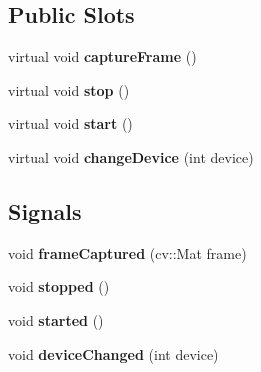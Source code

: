 \subsection*{Public Slots}
\begin{DoxyCompactItemize}
\item 
\mbox{\label{class_c_v_video_capture_aa8149e80fb17a0cf98425ebb17756ac0}} 
virtual void {\bfseries capture\+Frame} ()
\item 
\mbox{\label{class_c_v_video_capture_a4ea7818ffa44635751de5e7bec45262d}} 
virtual void {\bfseries stop} ()
\item 
\mbox{\label{class_c_v_video_capture_a50551374a42426ed9e68277458adfa86}} 
virtual void {\bfseries start} ()
\item 
\mbox{\label{class_c_v_video_capture_a2a0d45d4ce676b5e7a8cdb8f9e909e0c}} 
virtual void {\bfseries change\+Device} (int device)
\end{DoxyCompactItemize}
\subsection*{Signals}
\begin{DoxyCompactItemize}
\item 
\mbox{\label{class_c_v_video_capture_aede6e630cff60ec95bfeb8dcf90902d2}} 
void {\bfseries frame\+Captured} (cv\+::\+Mat frame)
\item 
\mbox{\label{class_c_v_video_capture_a0c24cf47e8ace4a144e2e1fc250726e0}} 
void {\bfseries stopped} ()
\item 
\mbox{\label{class_c_v_video_capture_a9b342b007ec37610ffda32ad9174c4a9}} 
void {\bfseries started} ()
\item 
\mbox{\label{class_c_v_video_capture_ae69915746841326093fc30499902732d}} 
void {\bfseries device\+Changed} (int device)
\end{DoxyCompactItemize}
